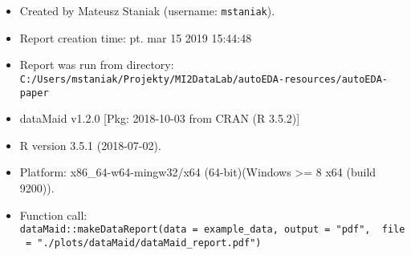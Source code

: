 \documentclass[]{report}
\begin{document}
\begin{itemize}
\item
  Created by Mateusz Staniak (username: \texttt{mstaniak}).
\item
  Report creation time: pt. mar 15 2019 15:44:48
\item
  Report was run from directory:
  \texttt{C:/Users/mstaniak/Projekty/MI2DataLab/autoEDA-resources/autoEDA-paper}
\item
  dataMaid v1.2.0 {[}Pkg: 2018-10-03 from CRAN (R 3.5.2){]}
\item
  R version 3.5.1 (2018-07-02).
\item
  Platform: x86\_64-w64-mingw32/x64 (64-bit)(Windows \textgreater{}= 8
  x64 (build 9200)).
\item
  Function call:
  \texttt{dataMaid::makeDataReport(data\ =\ example\_data,\ output\ =\ "pdf",\ \ file\ =\ "./plots/dataMaid/dataMaid\_report.pdf")}
\end{itemize}
\end{document}

